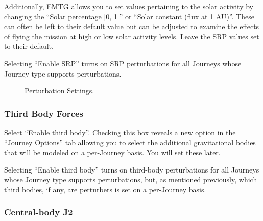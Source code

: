 \documentclass[11pt]{article}
\begin{document}
\noindent Additionally, \ac{EMTG} allows you to set values pertaining to the solar activity by changing the ``Solar percentage [0, 1]'' or ``Solar constant (flux at 1 \acs{AU})''. These can often be left to their default value but can be adjusted to examine the effects of flying the mission at high or low solar activity levels. Leave the \ac{SRP} values set to their default.

\noindent Selecting ``Enable SRP'' turns on \ac{SRP} perturbations for all Journeys whose Journey type supports perturbations.

\begin{figure}
	\centering
	\caption{\label{fig:perturbation_settings}Perturbation Settings.}
\end{figure}

\subsubsection{Third Body Forces}
\label{sec:third_body_forces}

Select ``Enable third body''. Checking this box reveals a new option in the ``Journey Options'' tab allowing you to select the additional gravitational bodies that will be modeled on a per-Journey basis. You will set these later.

\noindent Selecting ``Enable third body'' turns on third-body perturbations for all Journeys whose Journey type supports perturbations, but, as mentioned previously, which third bodies, if any, are perturbers is set on a per-Journey basis.

\subsubsection{Central-body J2}
\label{sec:central_body_j2}
\end{document}
